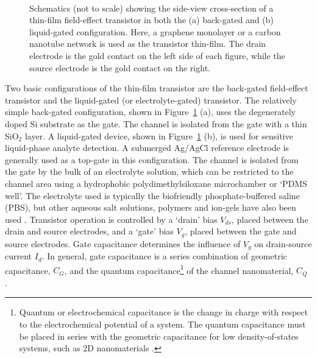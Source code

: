 \documentclass[
  a4paper,
]{scrbook}
\begin{document}
\begin{figure}
\begin{minipage}[t]{0.45\linewidth}
{{}

}

\end{minipage}%
%
\begin{minipage}[t]{0.01\linewidth}

{\centering 

~

}

\end{minipage}%

\caption{\label{fig-gating-schematics}Schematics (not to scale) showing
the side-view cross-section of a thin-film field-effect transistor in
both the (a) back-gated and (b) liquid-gated configuration. Here, a
graphene monolayer or a carbon nanotube network is used as the
transistor thin-film. The drain electrode is the gold contact on the
left side of each figure, while the source electrode is the gold contact
on the right.}

\end{figure}

Two basic configurations of the thin-film transistor are the back-gated
field-effect transistor and the liquid-gated (or electrolyte-gated)
transistor. The relatively simple back-gated configuration, shown in
Figure~\ref{fig-gating-schematics} (a), uses the degenerately doped Si
substrate as the gate. The channel is isolated from the gate with a thin
SiO\(_2\) layer. A liquid-gated device, shown in
Figure~\ref{fig-gating-schematics} (b), is used for sensitive
liquid-phase analyte detection. A submerged Ag/AgCl reference electrode
is generally used as a top-gate in this configuration. The channel is
isolated from the gate by the bulk of an electrolyte solution, which can
be restricted to the channel area using a hydrophobic
polydimethylsiloxane microchamber or `PDMS well'. The electrolyte used
is typically the biofriendly phosphate-buffered saline (PBS), but other
aqueous salt solutions, polymers and ion-gels have also been used
\autocite{Avouris2007,Shkodra2021,Tran2016,Li2023}. Transistor operation
is controlled by a `drain' bias \(V_{ds}\), placed between the drain and
source electrodes, and a `gate' bias \(V_g\), placed between the gate
and source electrodes. Gate capacitance determines the influence of
\(V_g\) on drain-source current \(I_d\). In general, gate capacitance is
a series combination of geometric capacitance, \(C_{G}\), and the
quantum capacitance\footnote{Quantum or electrochemical capacitance is
  the change in charge with respect to the electrochemical potential of
  a system. The quantum capacitance must be placed in series with the
  geometric capacitance for low density-of-states systems, such as 2D
  nanomaterials \autocite{Luryi1988,Xia2009,Miranda2016}.} of the
channel nanomaterial, \(C_{Q}\)
\autocite{Avouris2007,Cao2009,Heller2009a,Tran2016,Kireev2017,Li2023}.
\end{document}
